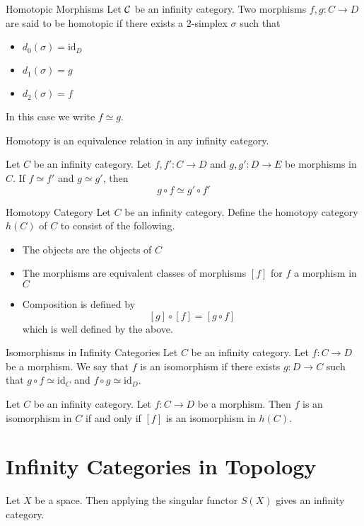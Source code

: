 \documentclass[a4paper]{article}
\begin{document}
\begin{defn}{Homotopic Morphisms}{} Let $\mathcal{C}$ be an infinity category. Two morphisms $f,g:C\to D$ are said to be homotopic if there exists a $2$-simplex $\sigma$ such that 
\begin{itemize}
\item $d_0(\sigma)=\text{id}_D$
\item $d_1(\sigma)=g$
\item $d_2(\sigma)=f$
\end{itemize}
In this case we write $f\simeq g$. 
\end{defn}

\begin{lmm}{}{} Homotopy is an equivalence relation in any infinity category. 
\end{lmm}

\begin{prp}{}{} Let $C$ be an infinity category. Let $f,f':C\to D$ and $g,g':D\to E$ be morphisms in $C$. If $f\simeq f'$ and $g\simeq g'$, then $$g\circ f\simeq g'\circ f'$$
\end{prp}

\begin{defn}{Homotopy Category}{} Let $C$ be an infinity category. Define the homotopy category $h(C)$ of $C$ to consist of the following. 
\begin{itemize}
\item The objects are the objects of $C$
\item The morphisms are equivalent classes of morphisms $[f]$ for $f$ a morphism in $C$
\item Composition is defined by $$[g]\circ[f]=[g\circ f]$$ which is well defined by the above. 
\end{itemize}
\end{defn}

\begin{defn}{Isomorphisms in Infinity Categories}{} Let $C$ be an infinity category. Let $f:C\to D$ be a morphism. We say that $f$ is an isomorphism if there exists $g:D\to C$ such that $g\circ f\simeq\text{id}_C$ and $f\circ g\simeq\text{id}_D$. 
\end{defn}

\begin{lmm}{}{} Let $C$ be an infinity category. Let $f:C\to D$ be a morphism. Then $f$ is an isomorphism in $C$ if and only if $[f]$ is an isomorphism in $h(C)$. 
\end{lmm}

\pagebreak
\section{Infinity Categories in Topology}
\begin{lmm}{}{} Let $X$ be a space. Then applying the singular functor $S(X)$ gives an infinity category. 
\end{lmm}
\end{document}
